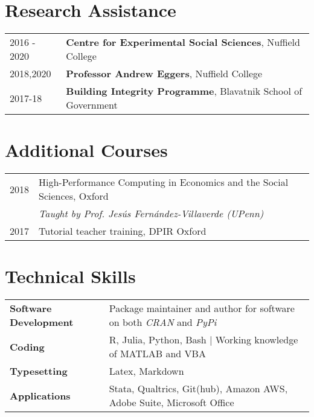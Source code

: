 \documentclass[11pt, a4paper]{article}
\begin{document}
  \section*{Research Assistance}
  \begin{tabular}{ll}
    2016 - 2020 & \textbf{Centre for Experimental Social Sciences}, Nuffield College \\
    2018,2020 & \textbf{Professor Andrew Eggers}, Nuffield College \\
    2017-18 & \textbf{Building Integrity Programme}, Blavatnik School of Government \\
 \end{tabular}

 \section*{Additional Courses}
 \begin{tabular}{ll}
     2018 & High-Performance Computing in Economics and the Social Sciences, Oxford\\
          & \textit{Taught by Prof. Jesús Fernández-Villaverde (UPenn)} \\
     2017 & Tutorial teacher training, DPIR Oxford\\
\end{tabular}

 \section*{Technical Skills}
 \begin{tabular}{ll}
 	 \textbf{Software Development} & Package maintainer and author for software on both \textit{CRAN} and \textit{PyPi} \\
     \textbf{Coding} & R, Julia, Python, Bash $|$ Working knowledge of MATLAB and VBA \\
     \textbf{Typesetting} & Latex, Markdown \\
     \textbf{Applications} & Stata, Qualtrics, Git(hub), Amazon AWS, Adobe Suite, Microsoft Office
 \end{tabular}
\end{document}
